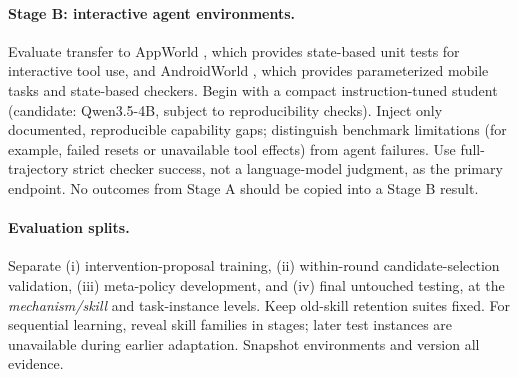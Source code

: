 \paragraph{Stage B: interactive agent environments.}
Evaluate transfer to AppWorld \citep{trivedi2024appworld}, which
provides state-based unit tests for interactive tool use, and
AndroidWorld \citep{rawles2024androidworld}, which provides
parameterized mobile tasks and state-based checkers. Begin with
a compact instruction-tuned student (candidate:
Qwen3.5-4B, subject to reproducibility checks). Inject only
documented, reproducible capability gaps; distinguish benchmark
limitations (for example, failed resets or unavailable tool effects)
from agent failures. Use full-trajectory strict checker success,
not a language-model judgment, as the primary endpoint.
No outcomes from Stage A should be copied into a Stage B result.

\paragraph{Evaluation splits.}
Separate (i) intervention-proposal training, (ii) within-round
candidate-selection validation, (iii) meta-policy development,
and (iv) final untouched testing, at the \emph{mechanism/skill}
and task-instance levels. Keep old-skill retention suites fixed.
For sequential learning, reveal skill families in stages; later
test instances are unavailable during earlier adaptation.
Snapshot environments and version all evidence.

